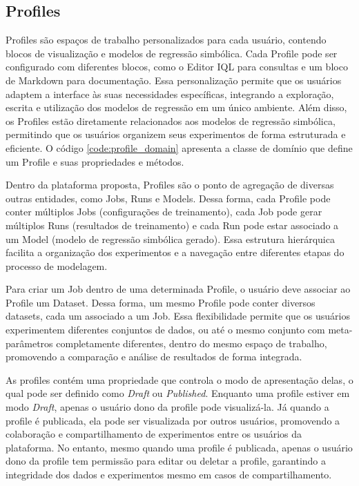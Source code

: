 \subsection{Profiles}
Profiles são espaços de trabalho personalizados para cada usuário, contendo blocos de visualização e modelos de regressão simbólica. Cada Profile pode ser configurado com diferentes blocos, como o Editor IQL para consultas e um bloco de Markdown para documentação. Essa personalização permite que os usuários adaptem a interface às suas necessidades específicas, integrando a exploração, escrita e utilização dos modelos de regressão em um único ambiente. Além disso, os Profiles estão diretamente relacionados aos modelos de regressão simbólica, permitindo que os usuários organizem seus experimentos de forma estruturada e eficiente. O código \ref{code:profile_domain} apresenta a classe de domínio que define um Profile e suas propriedades e métodos.

Dentro da plataforma proposta, Profiles são o ponto de agregação de diversas outras entidades, como Jobs, Runs e Models. Dessa forma, cada Profile pode conter múltiplos Jobs (configurações de treinamento), cada Job pode gerar múltiplos Runs (resultados de treinamento) e cada Run pode estar associado a um Model (modelo de regressão simbólica gerado). Essa estrutura hierárquica facilita a organização dos experimentos e a navegação entre diferentes etapas do processo de modelagem.

Para criar um Job dentro de uma determinada Profile, o usuário deve associar ao Profile um Dataset. Dessa forma, um mesmo Profile pode conter diversos datasets, cada um associado a um Job. Essa flexibilidade permite que os usuários experimentem diferentes conjuntos de dados, ou até o mesmo conjunto com meta-parâmetros completamente diferentes, dentro do mesmo espaço de trabalho, promovendo a comparação e análise de resultados de forma integrada.

As profiles contém uma propriedade que controla o modo de apresentação delas, o qual pode ser definido como \textit{Draft} ou \textit{Published}. Enquanto uma profile estiver em modo \textit{Draft}, apenas o usuário dono da profile pode visualizá-la. Já quando a profile é publicada, ela pode ser visualizada por outros usuários, promovendo a colaboração e compartilhamento de experimentos entre os usuários da plataforma. No entanto, mesmo quando uma profile é publicada, apenas o usuário dono da profile tem permissão para editar ou deletar a profile, garantindo a integridade dos dados e experimentos mesmo em casos de compartilhamento.

